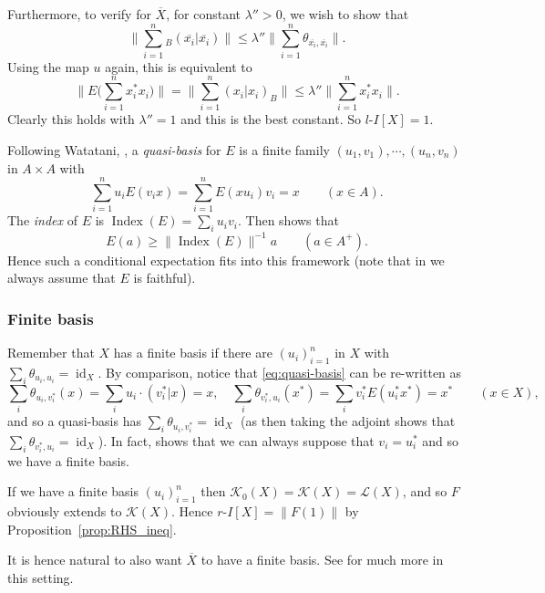 \documentclass[a4paper,11pt]{article}
\theoremstyle{plain}
\theoremstyle{remark}
\newcommand{\mc}[1]{\mathcal{#1}}
\newcommand{\id}{\operatorname{id}}
\newcommand{\iindex}{\operatorname{Index}}
\begin{document}
Furthermore, to verify \cite[Proposition~2.12]{KPW_JonesIndexTheory} for $\overline X$, for constant $\lambda''>0$, we wish to show that
\[ \Big\| \sum_{i=1}^n {}_B(\overline{x_i}|\overline{x_i}) \Big\| 
\leq \lambda'' \Big\| \sum_{i=1}^n \theta_{\overline{x_i},\overline{x_i}} \Big\|. \]
Using the map $u$ again, this is equivalent to
\[ \Big\| E\Big(\sum_{i=1}^n x_i^*x_i\Big)\Big\|
= \Big\| \sum_{i=1}^n (x_i|x_i)_B \Big\|
\leq \lambda'' \Big\| \sum_{i=1}^n x_i^* x_i \Big\|. \]
Clearly this holds with $\lambda''=1$ and this is the best constant.  So $l\text{-}I[X]=1$.

Following Watatani, \cite[Definition~1.2.2]{Watatani_indexcstar}, a \emph{quasi-basis} for $E$ is a finite family $(u_1,v_1), \cdots, (u_n,v_n)$ in $A\times A$ with
\begin{equation}\label{eq:quasi-basis}
\sum_{i=1}^n u_i E(v_ix) = \sum_{i=1}^n E(xu_i) v_i = x \qquad (x\in A).
\end{equation}
The \emph{index} of $E$ is $\iindex(E) = \sum_i u_i v_i$.  Then \cite[Proposition~2.6.2]{Watatani_indexcstar} shows that
\[ E(a) \geq \|\iindex(E)\|^{-1} a \qquad (a\in A^+). \]
Hence such a conditional expectation fits into this framework (note that in \cite{Watatani_indexcstar} we always assume that $E$ is faithful).


\subsubsection{Finite basis}

Remember that $X$ has a finite basis if there are $(u_i)_{i=1}^n$ in $X$ with $\sum_i \theta_{u_i,u_i} = \id_X$.  By comparison, notice that \eqref{eq:quasi-basis} can be re-written as
\[ \sum_i \theta_{u_i, v_i^*}(x) = \sum_i u_i \cdot (v_i^*|x) = x, \quad
\sum_i \theta_{v_i^*, u_i}(x^*) = \sum_i v_i^* E(u_i^*x^*) = x^* \qquad (x\in X), \]
and so a quasi-basis has $\sum_i \theta_{u_i, v_i^*} = \id_X$ (as then taking the adjoint shows that $\sum_i \theta_{v_i^*, u_i} = \id_X$).  In fact, \cite[Lemma~2.1.6]{Watatani_indexcstar} shows that we can always suppose that $v_i = u_i^*$ and so we have a finite basis.

If we have a finite basis $(u_i)_{i=1}^n$ then $\mc K_0(X) = \mc K(X) = \mc L(X)$, and so $F$ obviously extends to $\mc K(X)$.  Hence $r\text{-}I[X] = \|F(1)\|$ by Proposition~\ref{prop:RHS_ineq}.

It is hence natural to also want $\overline X$ to have a finite basis.  See \cite{KW_JonesIndexBimods} for much more in this setting.
\end{document}

